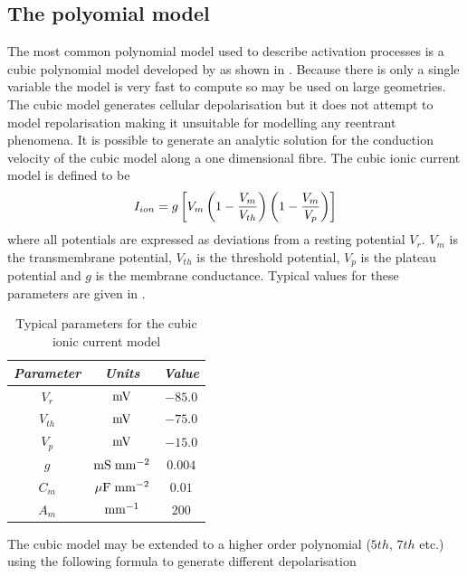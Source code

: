 \subsection{The polyomial model}
\label{sec:The_polynomial_model}
The most common polynomial model used to describe activation processes is a
cubic polynomial model developed by \citet{hunter:1975} as shown in
. Because there is only a single
variable the model is very fast to compute so may be used on large geometries.
The cubic model generates cellular depolarisation but it does not attempt to
model repolarisation making it unsuitable for modelling any reentrant
phenomena. It is possible to generate an analytic solution for the conduction
velocity of the cubic model along a one dimensional fibre. The cubic ionic current
model is defined to be
\begin{equation}
  I_{ion} = g \left[  V_m \left(  1 - \dfrac{V_m}{V_{th}} \right)
  \left(  1 - \dfrac{V_m}{V_p} \right) \right]
  \label{eqn:cubic_ionic_current_model}
\end{equation}
where all potentials are expressed as deviations from a resting potential
$V_r$. $V_m$ is the transmembrane potential, $V_{th}$ is the threshold
potential, $V_p$ is the plateau potential and $g$ is the membrane conductance.
Typical values for these parameters are given in .
\begin{table}[hbtp] \centering
  \begin{tabular}{|c|c|c|}
    \hline
    \emph{Parameter} & \emph{Units} & \emph{Value} \\ 
    \hline
    \hline 
    $V_r$ & $\mathrm{mV}$ & $-85.0$ \\
    $V_{th}$ & $\mathrm{mV}$ & $-75.0$ \\
    $V_p$ & $\mathrm{mV}$ & $-15.0$ \\
    $g$ & ${\mathrm{mS}\thickspace\mathrm{mm}^{-2}}$ & $0.004$ \\
    $C_m$ & $\mathrm{\mu F}\thickspace\mathrm{mm}^{-2}$ & $0.01$ \\
    $A_m$ & $\mathrm{mm}^{-1}$ & $200$ \\
    \hline
  \end{tabular}
  \caption[Typical parameters for the cubic ionic current model]{Typical
    parameters for the cubic ionic current model}
  \label{tab:Cubic_Model_Params}
\end{table}
The cubic model may be extended to a higher order polynomial ($5th$, $7th$
etc.) using the following formula to generate different depolarisation
